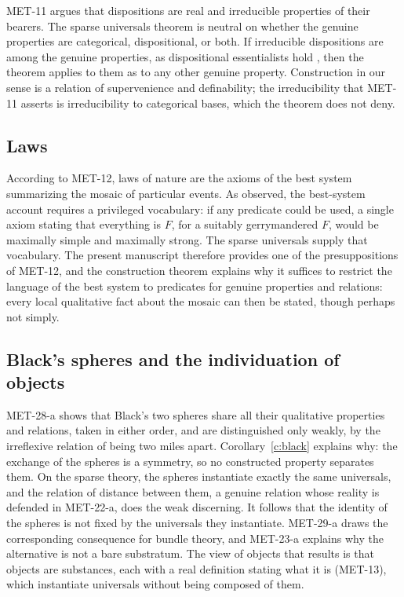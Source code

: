\documentclass{situationist-preprint}
\begin{document}
MET-11 argues that dispositions are real and irreducible properties of their bearers. The sparse universals theorem is neutral on whether the genuine properties are categorical, dispositional, or both. If irreducible dispositions are among the genuine properties, as dispositional essentialists hold \citep{Bird2007}, then the theorem applies to them as to any other genuine property. Construction in our sense is a relation of supervenience and definability; the irreducibility that MET-11 asserts is irreducibility to categorical bases, which the theorem does not deny.

\subsection{Laws}

According to MET-12, laws of nature are the axioms of the best system summarizing the mosaic of particular events. As \citet{Lewis1983} observed, the best-system account requires a privileged vocabulary: if any predicate could be used, a single axiom stating that everything is $F$, for a suitably gerrymandered $F$, would be maximally simple and maximally strong. The sparse universals supply that vocabulary. The present manuscript therefore provides one of the presuppositions of MET-12, and the construction theorem explains why it suffices to restrict the language of the best system to predicates for genuine properties and relations: every local qualitative fact about the mosaic can then be stated, though perhaps not simply.

\subsection{Black's spheres and the individuation of objects}

MET-28-a shows that Black's two spheres share all their qualitative properties and relations, taken in either order, and are distinguished only weakly, by the irreflexive relation of being two miles apart. Corollary~\ref{c:black} explains why: the exchange of the spheres is a symmetry, so no constructed property separates them. On the sparse theory, the spheres instantiate exactly the same universals, and the relation of distance between them, a genuine relation whose reality is defended in MET-22-a, does the weak discerning. It follows that the identity of the spheres is not fixed by the universals they instantiate. MET-29-a draws the corresponding consequence for bundle theory, and MET-23-a explains why the alternative is not a bare substratum. The view of objects that results is that objects are substances, each with a real definition stating what it is (MET-13), which instantiate universals without being composed of them.
\end{document}
